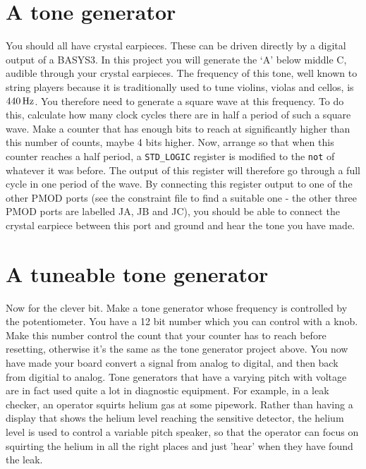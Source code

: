 \documentclass[../physical_computing.tex]{subfiles}
\begin{document}
\section{A tone generator}
\label{sec:tonegen}

You should all have crystal earpieces. These can be driven directly by a digital output of a BASYS3. In this project you will generate the `A' below middle C, audible through your crystal earpieces. The frequency of this tone, well known to string players because it is traditionally used to tune violins, violas and cellos, is $\rm 440\,Hz$. You therefore need to generate a square wave at this frequency. To do this, calculate how many clock cycles there are in half a period of such a square wave. Make a counter that has enough bits to reach at significantly higher than this number of counts, maybe 4 bits higher. Now, arrange so that when this counter reaches a half period, a \texttt{STD\_LOGIC} register is modified to the \texttt{not} of whatever it was before. The output of this register will therefore go through a full cycle in one period of the wave. By connecting this register output to one of the other PMOD ports (see the constraint file to find a suitable one - the other three PMOD ports are labelled JA, JB and JC), you should be able to connect the crystal earpiece between this port and ground and hear the tone you have made.

\section{A tuneable tone generator}
\label{eq:tuneable}

Now for the clever bit. Make a tone generator whose frequency is controlled by the potentiometer. You have a 12 bit number which you can control with a knob. Make this number control the count that your counter has to reach before resetting, otherwise it's the same as the tone generator project above. You now have made your board convert a signal from analog to digital, and then back from digitial to analog. Tone generators that have a varying pitch with voltage are in fact used quite a lot in diagnostic equipment. For example, in a leak checker, an operator squirts helium gas at some pipework. Rather than having a display that shows the helium level reaching the sensitive detector, the helium level is used to control a variable pitch speaker, so that the operator can focus on squirting the helium in all the right places and just 'hear' when they have found the leak.
\end{document}
